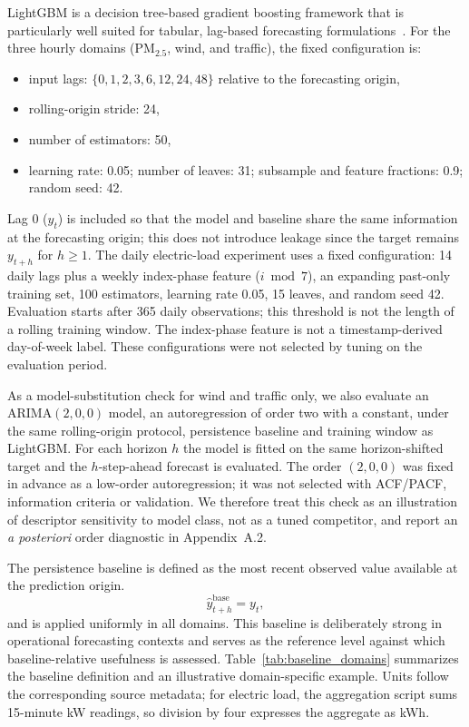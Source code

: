 \documentclass[pdflatex]{sn-jnl}
\begin{document}
LightGBM is a decision tree-based gradient boosting framework that is
particularly well suited for tabular, lag-based forecasting
formulations~\citep{ke2017lightgbm}. For the three hourly domains
(PM$_{2.5}$, wind, and traffic), the fixed configuration is:
\begin{itemize}
  \item input lags: $\{0,1,2,3,6,12,24,48\}$ relative to the forecasting origin,
  \item rolling-origin stride: 24,
  \item number of estimators: 50,
  \item learning rate: 0.05; number of leaves: 31; subsample and feature
  fractions: 0.9; random seed: 42.
\end{itemize}
Lag 0 ($y_t$) is included so that the model and baseline share the same
information at the forecasting origin; this does not introduce leakage
since the target remains $y_{t+h}$ for $h \geq 1$.
The daily electric-load experiment uses a fixed
configuration: 14 daily lags plus a weekly index-phase feature ($i\bmod7$),
an expanding past-only training set, 100 estimators, learning rate 0.05,
15 leaves, and random seed 42. Evaluation starts after 365 daily
observations; this threshold is not the length of a rolling training window.
The index-phase feature is not a timestamp-derived day-of-week label.
These configurations were not selected by tuning on the evaluation period.

As a model-substitution check for wind and traffic only, we also evaluate an
ARIMA$(2,0,0)$ model, an autoregression of order two with a constant, under
the same rolling-origin protocol, persistence baseline and training window as
LightGBM. For each horizon $h$ the model is fitted on the same horizon-shifted
target and the $h$-step-ahead forecast is evaluated. The order $(2,0,0)$ was
fixed in advance as a low-order autoregression; it was not selected with
ACF/PACF, information criteria or validation. We therefore treat this check as
an illustration of descriptor sensitivity to model class, not as a tuned
competitor, and report an \emph{a posteriori} order diagnostic in
Appendix~A.2.

The persistence baseline is defined as the most recent observed value
available at the prediction origin.
\begin{equation}
\hat{y}^{\mathrm{base}}_{t+h} = y_t,
\end{equation}
and is applied uniformly in all domains. This baseline is deliberately
strong in operational forecasting contexts and serves as the reference
level against which baseline-relative usefulness is assessed.
Table~\ref{tab:baseline_domains} summarizes the baseline definition and an
illustrative domain-specific example. Units follow the corresponding source
metadata; for electric load, the aggregation script sums 15-minute kW
readings, so division by four expresses the aggregate as kWh.
\end{document}
